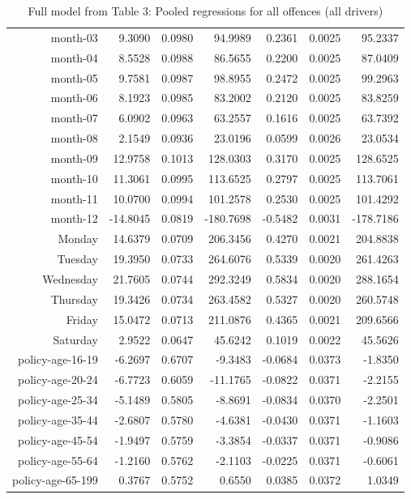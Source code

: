 \documentclass[10pt]{article}
\begin{document}
\begin{table}[ht]
\begin{tabular}{rrrrrrr}
  month-03 & 9.3090 & 0.0980 & 94.9989 & 0.2361 & 0.0025 & 95.2337 \\ 
  month-04 & 8.5528 & 0.0988 & 86.5655 & 0.2200 & 0.0025 & 87.0409 \\ 
  month-05 & 9.7581 & 0.0987 & 98.8955 & 0.2472 & 0.0025 & 99.2963 \\ 
  month-06 & 8.1923 & 0.0985 & 83.2002 & 0.2120 & 0.0025 & 83.8259 \\ 
  month-07 & 6.0902 & 0.0963 & 63.2557 & 0.1616 & 0.0025 & 63.7392 \\ 
  month-08 & 2.1549 & 0.0936 & 23.0196 & 0.0599 & 0.0026 & 23.0534 \\ 
  month-09 & 12.9758 & 0.1013 & 128.0303 & 0.3170 & 0.0025 & 128.6525 \\ 
  month-10 & 11.3061 & 0.0995 & 113.6525 & 0.2797 & 0.0025 & 113.7061 \\ 
  month-11 & 10.0700 & 0.0994 & 101.2578 & 0.2530 & 0.0025 & 101.4292 \\ 
  month-12 & -14.8045 & 0.0819 & -180.7698 & -0.5482 & 0.0031 & -178.7186 \\ 
  Monday & 14.6379 & 0.0709 & 206.3456 & 0.4270 & 0.0021 & 204.8838 \\ 
  Tuesday & 19.3950 & 0.0733 & 264.6076 & 0.5339 & 0.0020 & 261.4263 \\ 
  Wednesday & 21.7605 & 0.0744 & 292.3249 & 0.5834 & 0.0020 & 288.1654 \\ 
  Thursday & 19.3426 & 0.0734 & 263.4582 & 0.5327 & 0.0020 & 260.5748 \\ 
  Friday & 15.0472 & 0.0713 & 211.0876 & 0.4365 & 0.0021 & 209.6566 \\ 
  Saturday & 2.9522 & 0.0647 & 45.6242 & 0.1019 & 0.0022 & 45.5626 \\ 
  policy-age-16-19 & -6.2697 & 0.6707 & -9.3483 & -0.0684 & 0.0373 & -1.8350 \\ 
  policy-age-20-24 & -6.7723 & 0.6059 & -11.1765 & -0.0822 & 0.0371 & -2.2155 \\ 
  policy-age-25-34 & -5.1489 & 0.5805 & -8.8691 & -0.0834 & 0.0370 & -2.2501 \\ 
  policy-age-35-44 & -2.6807 & 0.5780 & -4.6381 & -0.0430 & 0.0371 & -1.1603 \\ 
  policy-age-45-54 & -1.9497 & 0.5759 & -3.3854 & -0.0337 & 0.0371 & -0.9086 \\ 
  policy-age-55-64 & -1.2160 & 0.5762 & -2.1103 & -0.0225 & 0.0371 & -0.6061 \\ 
  policy-age-65-199 & 0.3767 & 0.5752 & 0.6550 & 0.0385 & 0.0372 & 1.0349 \\ 
   \hline
\end{tabular}
\caption{Full model from Table 3: Pooled regressions for all offences (all drivers)} 
\label{tab_3_all_pts_A}
\end{table}
\end{document}
